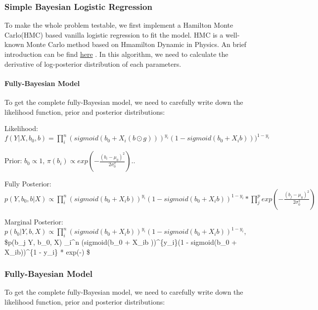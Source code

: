 \documentclass[
]{article}
\begin{document}
\hypertarget{simple-bayesian-logistic-regression}{%
\subsubsection{Simple Bayesian Logistic
Regression}\label{simple-bayesian-logistic-regression}}

To make the whole problem testable, we first implement a Hamilton Monte
Carlo(HMC) based vanilla logistic regression to fit the model. HMC is a
well-known Monte Carlo method based on Hmamilton Dynamic in Physics. An
brief introduction can be find
\href{https://en.wikipedia.org/wiki/Hamiltonian_Monte_Carlo}{here} . In
this algorithm, we need to calculate the derivative of log-posterior
distribution of each parameters.

\hypertarget{fully-bayesian-model}{%
\paragraph{Fully-Bayesian Model}\label{fully-bayesian-model}}

To get the complete fully-Bayesian model, we need to carefully write
down the likelihood function, prior and posterior distributions:

Likelihood:
\(f(Y|X,b_0, b) = \prod_i^n (sigmoid(b_0 + X_i(b \odot g)))^{y_i}(1 - sigmoid(b_0 + X_ib)))^{1 - y_i}\)

Prior: \(b_0 \varpropto 1\),
\(\pi(b_i) \varpropto exp(-\frac{(b_i - \mu_0)^2}{2\sigma_0^2})\)..

Fully Posterior:
\(p(Y, b_0, b | X) \varpropto \prod_i^n (sigmoid(b_0 + X_ib ))^{y_i}(1 - sigmoid(b_0 + X_ib))^{1 - y_i} * \prod_j^p exp(-\frac{(b_j - \mu_0)^2}{2\sigma_0^2})\)

Marginal Posterior:
\(p(b_0 | Y, b, X) \varpropto \prod_i^n (sigmoid(b_0 + X_ib ))^{y_i}(1 - sigmoid(b_0 + X_ib))^{1 - y_i}\),
\$p(b\_j \textbar{} Y, b\_0, X) \varpropto \prod\_i\^{}n (sigmoid(b\_0 +
X\_ib ))\^{}\{y\_i\}(1 - sigmoid(b\_0 + X\_ib))\^{}\{1 - y\_i\} *
exp(-) \$

\hypertarget{fully-bayesian-model-1}{%
\subsubsection{Fully-Bayesian Model}\label{fully-bayesian-model-1}}

To get the complete fully-Bayesian model, we need to carefully write
down the likelihood function, prior and posterior distributions:
\end{document}
